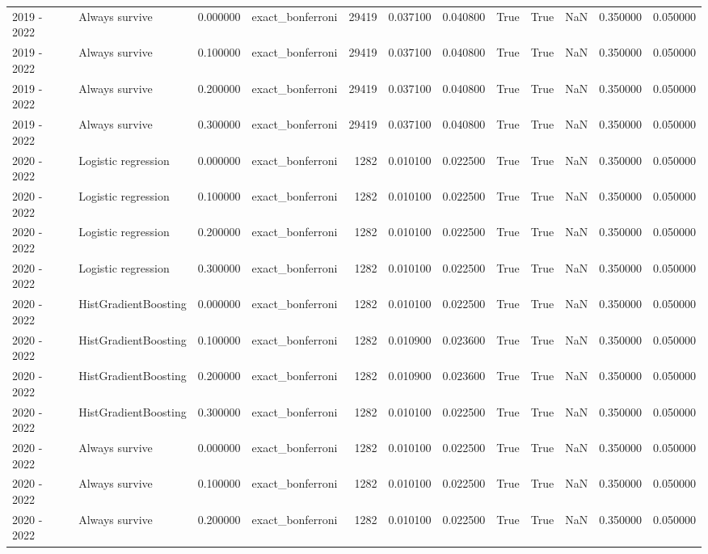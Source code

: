 \begin{tabular}{llrlrrrrrrrr}
2019 - 2022 & Always survive & 0.000000 & exact_bonferroni & 29419 & 0.037100 & 0.040800 & True & True & NaN & 0.350000 & 0.050000 \\
2019 - 2022 & Always survive & 0.100000 & exact_bonferroni & 29419 & 0.037100 & 0.040800 & True & True & NaN & 0.350000 & 0.050000 \\
2019 - 2022 & Always survive & 0.200000 & exact_bonferroni & 29419 & 0.037100 & 0.040800 & True & True & NaN & 0.350000 & 0.050000 \\
2019 - 2022 & Always survive & 0.300000 & exact_bonferroni & 29419 & 0.037100 & 0.040800 & True & True & NaN & 0.350000 & 0.050000 \\
2020 - 2022 & Logistic regression & 0.000000 & exact_bonferroni & 1282 & 0.010100 & 0.022500 & True & True & NaN & 0.350000 & 0.050000 \\
2020 - 2022 & Logistic regression & 0.100000 & exact_bonferroni & 1282 & 0.010100 & 0.022500 & True & True & NaN & 0.350000 & 0.050000 \\
2020 - 2022 & Logistic regression & 0.200000 & exact_bonferroni & 1282 & 0.010100 & 0.022500 & True & True & NaN & 0.350000 & 0.050000 \\
2020 - 2022 & Logistic regression & 0.300000 & exact_bonferroni & 1282 & 0.010100 & 0.022500 & True & True & NaN & 0.350000 & 0.050000 \\
2020 - 2022 & HistGradientBoosting & 0.000000 & exact_bonferroni & 1282 & 0.010100 & 0.022500 & True & True & NaN & 0.350000 & 0.050000 \\
2020 - 2022 & HistGradientBoosting & 0.100000 & exact_bonferroni & 1282 & 0.010900 & 0.023600 & True & True & NaN & 0.350000 & 0.050000 \\
2020 - 2022 & HistGradientBoosting & 0.200000 & exact_bonferroni & 1282 & 0.010900 & 0.023600 & True & True & NaN & 0.350000 & 0.050000 \\
2020 - 2022 & HistGradientBoosting & 0.300000 & exact_bonferroni & 1282 & 0.010100 & 0.022500 & True & True & NaN & 0.350000 & 0.050000 \\
2020 - 2022 & Always survive & 0.000000 & exact_bonferroni & 1282 & 0.010100 & 0.022500 & True & True & NaN & 0.350000 & 0.050000 \\
2020 - 2022 & Always survive & 0.100000 & exact_bonferroni & 1282 & 0.010100 & 0.022500 & True & True & NaN & 0.350000 & 0.050000 \\
2020 - 2022 & Always survive & 0.200000 & exact_bonferroni & 1282 & 0.010100 & 0.022500 & True & True & NaN & 0.350000 & 0.050000 \\

\end{tabular}
